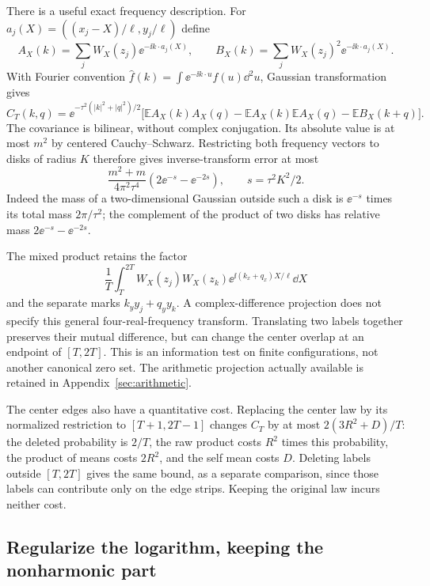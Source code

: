 There is a useful exact frequency description. For
$a_j(X)=((x_j-X)/\ell,y_j/\ell)$ define
\[
 A_X(k)=\sum_jW_X(z_j)\ee^{-\ii k\cdot a_j(X)},\qquad
 B_X(k)=\sum_jW_X(z_j)^2\ee^{-\ii k\cdot a_j(X)}.
\]
With Fourier convention $\widehat f(k)=\int\ee^{-\ii k\cdot u}f(u)\dd^2u$,
Gaussian transformation gives
\begin{equation}\label{eq:joint-fourier}
 \widehat C_T(k,q)=\ee^{-\tau^2(|k|^2+|q|^2)/2}
 \bigl[\mathbb E A_X(k)A_X(q)-\mathbb E A_X(k)\mathbb E A_X(q)
                          -\mathbb E B_X(k+q)\bigr].
\end{equation}
The covariance is bilinear, without complex conjugation. Its absolute
value is at most $m^2$ by centered Cauchy--Schwarz. Restricting both
frequency vectors to disks of radius $K$ therefore gives inverse-transform
error at most
\begin{equation}\label{eq:joint-frequency-tail}
 \frac{m^2+m}{4\pi^2\tau^4}(2\ee^{-s}-\ee^{-2s}),
 \qquad s=\tau^2K^2/2.
\end{equation}
Indeed the mass of a two-dimensional Gaussian outside such a disk is
$\ee^{-s}$ times its total mass $2\pi/\tau^2$; the complement of the
product of two disks has relative mass $2\ee^{-s}-\ee^{-2s}$.

The mixed product retains the factor
\[
 \frac1T\int_T^{2T}W_X(z_j)W_X(z_k)
             \ee^{\ii(k_x+q_x)X/\ell}\dd X
\]
and the separate marks $k_y y_j+q_y y_k$. A complex-difference projection
does not specify this general four-real-frequency transform. Translating
two labels together preserves their mutual difference, but can change
the center overlap at an endpoint of $[T,2T]$. This is an information
test on finite configurations, not another canonical zero set. The
arithmetic projection actually available is retained in
Appendix~\ref{sec:arithmetic}.

The center edges also have a quantitative cost. Replacing the center
law by its normalized restriction to $[T+1,2T-1]$ changes $C_T$ by at
most $2(3R^2+D)/T$: the deleted probability is $2/T$, the raw product
costs $R^2$ times this probability, the product of means costs $2R^2$,
and the self mean costs $D$. Deleting labels outside $[T,2T]$ gives
the same bound, as a separate comparison, since those labels can
contribute only on the edge strips. Keeping the original law incurs
neither cost.

\subsection{Regularize the logarithm, keeping the nonharmonic part}

